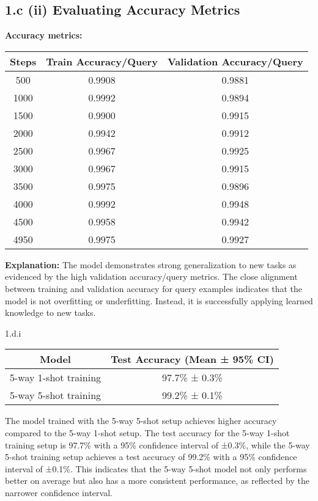 \begin{answer}
    \subsection*{1.c (ii) Evaluating Accuracy Metrics}

\textbf{Accuracy metrics:}

\begin{tabular}{|c|c|c|}
\hline
\textbf{Steps} & \textbf{Train Accuracy/Query} & \textbf{Validation Accuracy/Query} \\
\hline
500 & 0.9908 & 0.9881 \\
\hline
1000 & 0.9992 & 0.9894 \\
\hline
1500 & 0.9900 & 0.9915 \\
\hline
2000 & 0.9942 & 0.9912 \\
\hline
2500 & 0.9967 & 0.9925 \\
\hline
3000 & 0.9967 & 0.9915 \\
\hline
3500 & 0.9975 & 0.9896 \\
\hline
4000 & 0.9992 & 0.9948 \\
\hline
4500 & 0.9958 & 0.9942 \\
\hline
4950 & 0.9975 & 0.9927 \\
\hline
\end{tabular}

\textbf{Explanation:} The model demonstrates strong generalization to new tasks as evidenced by the high validation accuracy/query metrics. The close alignment between training and validation accuracy for query examples indicates that the model is not overfitting or underfitting. Instead, it is successfully applying learned knowledge to new tasks.

\end{answer}

\clearpage

\LARGE
1.d.i
\normalsize

\begin{answer}
    \begin{tabular}{|c|c|}
\hline
\textbf{Model} & \textbf{Test Accuracy (Mean ± 95\% CI)} \\
\hline
5-way 1-shot training & 97.7\% ± 0.3\% \\
\hline
5-way 5-shot training & 99.2\% ± 0.1\% \\
\hline
\end{tabular}

The model trained with the 5-way 5-shot setup achieves higher accuracy compared to the 5-way 1-shot setup. The test accuracy for the 5-way 1-shot training setup is 97.7\% with a 95\% confidence interval of ±0.3\%, while the 5-way 5-shot training setup achieves a test accuracy of 99.2\% with a 95\% confidence interval of ±0.1\%. This indicates that the 5-way 5-shot model not only performs better on average but also has a more consistent performance, as reflected by the narrower confidence interval.

\end{answer}

